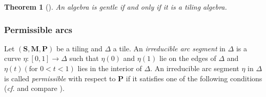 \documentclass[a4paper,10pt]{amsart}
\theoremstyle{plain}          %
\newtheorem{theorem}{Theorem}[section]
\theoremstyle{definition}
\def\SS{\mathbf{S}}
\def\MM{\mathbf{M}}
\def\PP{\mathbf{P}}
\def\MM{\mathbf{M}}
\begin{document}
\begin{theorem}[{\cite[Theorem 2.10]{BS}}]\label{t:tiling algebra} 
An algebra is gentle if and only if it is a tiling algebra.
\end{theorem}

\subsubsection{Permissible arcs} Let $(\SS,\MM,\PP)$ be a tiling and $\Delta$ a tile.
An {\it irreducible arc segment} in $\Delta$ is a curve $\eta: [0,1]\to \Delta$ such that  $\eta(0)$ and $\eta(1)$ lie on the edges of $\Delta$
and $\eta(t)(\text{for } 0<t<1)$ lies in the interior of $\Delta$. 
 An irreducible arc segment $\eta$ in $\Delta$ is called {\it permissible} with respect to $\PP$ if it satisfies one of the following conditions ({\em cf.} \cite[Definition 2.1]{HZZ} and compare \cite[Definition~3.1]{BS}).
\end{document}
